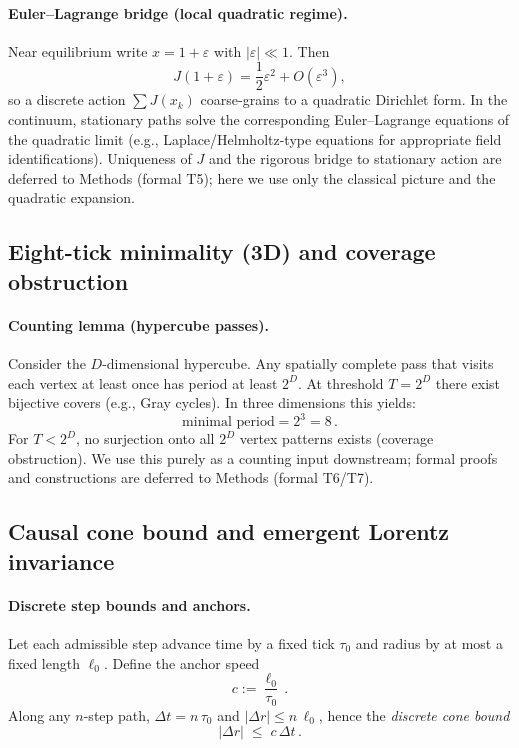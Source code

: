 \documentclass[11pt]{article}
\begin{document}
\paragraph{Euler--Lagrange bridge (local quadratic regime).} Near equilibrium write $x=1+\varepsilon$ with $|\varepsilon|\ll 1$. Then
\begin{equation}
J(1+\varepsilon) = \frac{1}{2}\varepsilon^2 + O(\varepsilon^3),
\end{equation}
so a discrete action $\sum J(x_k)$ coarse-grains to a quadratic Dirichlet form. In the continuum, stationary paths solve the corresponding Euler--Lagrange equations of the quadratic limit (e.g., Laplace/Helmholtz-type equations for appropriate field identifications). Uniqueness of $J$ and the rigorous bridge to stationary action are deferred to Methods (formal T5); here we use only the classical picture and the quadratic expansion.

\subsection{Eight-tick minimality (3D) and coverage obstruction}\label{subsec:eight-tick}

\paragraph{Counting lemma (hypercube passes).} Consider the $D$-dimensional hypercube. Any spatially complete pass that visits each vertex at least once has period at least $2^{D}$. At threshold $T=2^{D}$ there exist bijective covers (e.g., Gray cycles). In three dimensions this yields:
\begin{equation}
\text{minimal period} = 2^{3}=8\,.
\end{equation}
For $T<2^{D}$, no surjection onto all $2^D$ vertex patterns exists (coverage obstruction). We use this purely as a counting input downstream; formal proofs and constructions are deferred to Methods (formal T6/T7).

\subsection{Causal cone bound and emergent Lorentz invariance}\label{subsec:cone-lorentz}

\paragraph{Discrete step bounds and anchors.} Let each admissible step advance time by a fixed tick $\tau_0$ and radius by at most a fixed length $\ell_0$. Define the anchor speed
\begin{equation}
c := \frac{\ell_0}{\tau_0}\,.
\end{equation}
Along any $n$-step path, $\Delta t = n\,\tau_0$ and $|\Delta r|\le n\,\ell_0$, hence the \emph{discrete cone bound}
\begin{equation}
|\Delta r| \;\le\; c\,\Delta t\,.
\end{equation}
\end{document}
